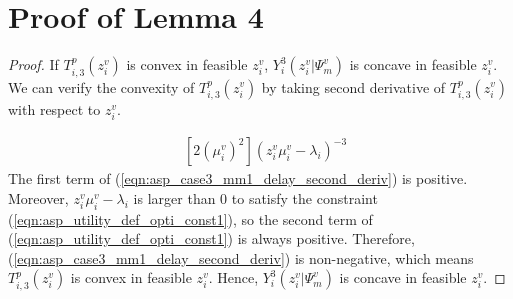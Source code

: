 \documentclass[10pt,journal, compsoc]{IEEEtran}
\begin{document}
  \section{Proof of Lemma 4}\label{appendix:lemma_4}
    \begin{proof}
    If $T_{i,3}^p(z_i^v)$ is convex in feasible $z_i^v$, $Y_i^3(z_i^v|\Psi_m^v)$ is concave in feasible $z_i^v$. We can verify the convexity of $T_{i,3}^p(z_i^v)$ by taking second derivative of $T_{i,3}^p(z_i^v)$ with respect to $z_i^v$.
    
    \begin{equation} \label{eqn:asp_case3_mm1_delay_second_deriv}
    \begin{aligned}
    &[2(\mu_i^v)^2](z_i^v\mu_i^v-\lambda_i)^{-3}
    \end{aligned}
    \end{equation}
    The first term of (\ref{eqn:asp_case3_mm1_delay_second_deriv}) is positive. Moreover, $z_i^v\mu_i^v - \lambda_i$ is larger than $0$ to satisfy the constraint (\ref{eqn:asp_utility_def_opti_const1}), so the second term of (\ref{eqn:asp_utility_def_opti_const1}) is always positive. Therefore, (\ref{eqn:asp_case3_mm1_delay_second_deriv}) is non-negative, which means $T_{i,3}^p(z_i^v)$ is convex in feasible $z_i^v$. Hence, $Y_i^3(z_i^v|\Psi_m^v)$ is concave in feasible $z_i^v$. \qedhere
    \end{proof}
\end{document}
